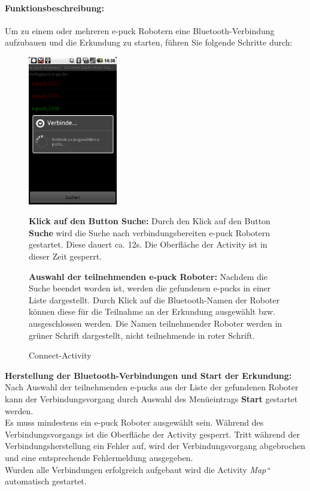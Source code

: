 \documentclass[10pt,a4paper]{article}
\begin{document}
			\paragraph*{Funktionsbeschreibung:}
		Um zu einem oder mehreren e-puck Robotern eine Bluetooth-Verbindung aufzubauen und die Erkundung zu starten, f\"uhren Sie folgende Schritte
		durch:
		\begin{enumerate}
			\begin{figure}[htbp]
				\begin{minipage}[t]{6.5cm}
					\vspace{0pt}
					\includegraphics[height=6.5cm]{images/connect3.png} 
					\caption{Connect-Activity}
				\end{minipage}
				\hfill
				\begin{minipage}[t]{0.5\textwidth}
					\vspace{5pt}
						\item \textbf{Klick auf den Button Suche:} Durch den Klick auf den Button \textbf{Suche} wird die Suche nach verbindungsbereiten e-puck
						Robotern gestartet. Diese dauert ca. 12s. Die Oberfl\"ache der Activity ist in dieser Zeit gesperrt.
						\item \textbf{Auswahl der teilnehmenden e-puck Roboter:} Nachdem die Suche beendet worden ist, werden die gefundenen e-pucks in einer
						Liste dargestellt. Durch Klick auf die Bluetooth-Namen der Roboter k\"onnen diese für die Teilnahme an der Erkundung ausgew\"ahlt bzw.
						ausgeschlossen werden. Die Namen teilnehmender Roboter werden in gr\"uner Schrift dargestellt, nicht teilnehmende in roter Schrift.						
				\end{minipage}
   			\end{figure}
   						\item \textbf{Herstellung der Bluetooth-Verbindungen und Start der Erkundung:} Nach Auswahl der teilnehmenden e-pucks aus der Liste der
						gefundenen Roboter kann der Verbindungsvorgang durch Auswahl des Men\"ueintrags \textbf{Start} gestartet werden. \\ 
						Es muss mindestens ein e-puck Roboter ausgew\"ahlt sein. Während des Verbindungsvorgangs ist die Oberfl\"ache der Activity gesperrt.
						Tritt w\"ahrend der Verbindungsherstellung ein Fehler auf, wird der Verbindungsvorgang abgebrochen und eine entsprechende Fehlermeldung
						ausgegeben. \\
						Wurden alle Verbindungen erfolgreich aufgebaut wird die Activity \textit{Map“} automatisch gestartet.
		\end{enumerate}
		
\end{document}
